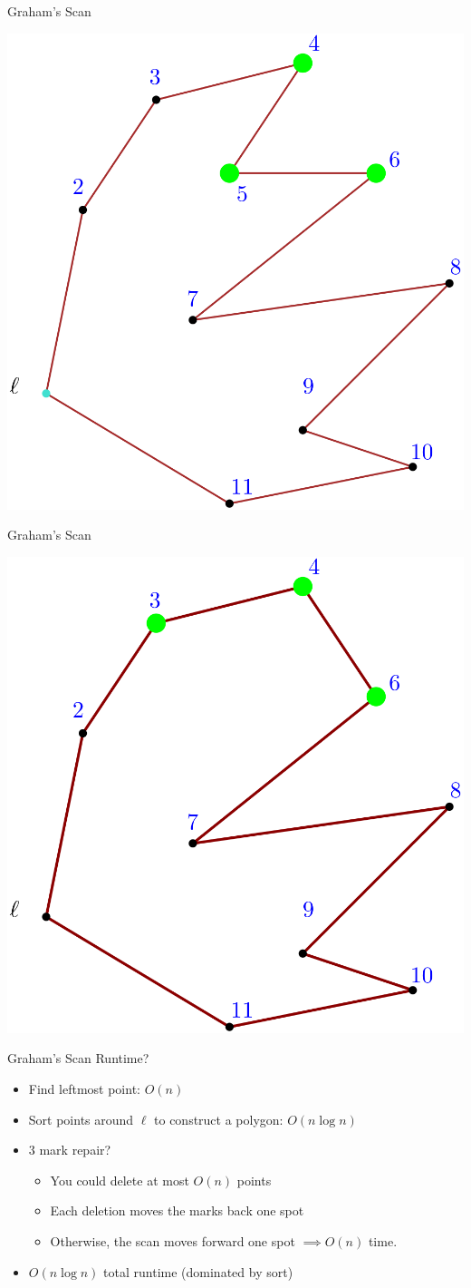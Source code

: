 \documentclass[aspectratio=169]{beamer}
\begin{document}
\begin{frame}{Graham's Scan}
    \begin{center}
        \includegraphics[width=.5\textwidth]{graham_pt3.png}
    \end{center}
\end{frame}

\begin{frame}{Graham's Scan}
    \begin{center}
        \includegraphics[width=.5\textwidth]{graham_pt4.png}
    \end{center}
\end{frame}

\begin{frame}{Graham's Scan}
    Runtime?
    \begin{itemize}
        \item Find leftmost point: $O(n)$ \pause 
        \item Sort points around $\ell$ to construct a polygon: $O(n \log n)$ \pause
        \item 3 mark repair? \pause
        \begin{itemize}
            \item You could delete at most $O(n)$ points \pause
            \item Each deletion moves the marks back one spot \pause
            \item Otherwise, the scan moves forward one spot $\implies O(n)$ time. \pause
        \end{itemize}
        \item $O(n \log n)$ total runtime (dominated by sort)
    \end{itemize}
\end{frame}
\end{document}
